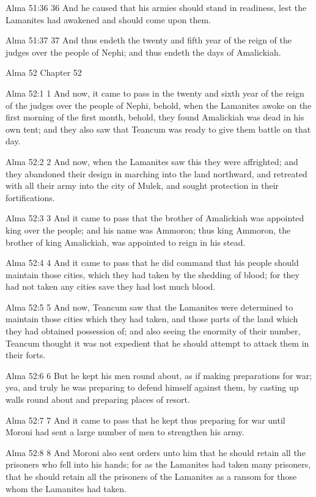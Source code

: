 Alma 51:36
 36 And he caused that his armies should stand in readiness, lest
the Lamanites had awakened and should come upon them.

Alma 51:37
 37 And thus endeth the twenty and fifth year of the reign of the
judges over the people of Nephi; and thus endeth the days of
Amalickiah.

Alma 52
Chapter 52

Alma 52:1
 1 And now, it came to pass in the twenty and sixth year of the
reign of the judges over the people of Nephi, behold, when the
Lamanites awoke on the first morning of the first month, behold,
they found Amalickiah was dead in his own tent; and they also saw
that Teancum was ready to give them battle on that day.

Alma 52:2
 2 And now, when the Lamanites saw this they were affrighted; and
they abandoned their design in marching into the land northward,
and retreated with all their army into the city of Mulek, and
sought protection in their fortifications.

Alma 52:3
 3 And it came to pass that the brother of Amalickiah was
appointed king over the people; and his name was Ammoron; thus
king Ammoron, the brother of king Amalickiah, was appointed to
reign in his stead.

Alma 52:4
 4 And it came to pass that he did command that his people should
maintain those cities, which they had taken by the shedding of
blood; for they had not taken any cities save they had lost much
blood.

Alma 52:5
 5 And now, Teancum saw that the Lamanites were determined to
maintain those cities which they had taken, and those parts of
the land which they had obtained possession of; and also seeing
the enormity of their number, Teancum thought it was not
expedient that he should attempt to attack them in their forts.

Alma 52:6
 6 But he kept his men round about, as if making preparations for
war; yea, and truly he was preparing to defend himself against
them, by casting up walls round about and preparing places of
resort.

Alma 52:7
 7 And it came to pass that he kept thus preparing for war until
Moroni had sent a large number of men to strengthen his army.

Alma 52:8
 8 And Moroni also sent orders unto him that he should retain all
the prisoners who fell into his hands; for as the Lamanites had
taken many prisoners, that he should retain all the prisoners of
the Lamanites as a ransom for those whom the Lamanites had taken.

